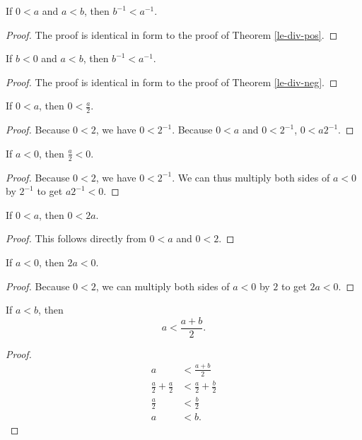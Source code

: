 \documentclass[../math.tex]{subfiles}
\begin{document}
\begin{theorem}
    If $0 < a$ and $a < b$, then $b^{-1} < a^{-1}$.
\end{theorem}
\begin{proof}
    The proof is identical in form to the proof of Theorem \ref{le-div-pos}.
\end{proof}

\begin{theorem}
    If $b < 0$ and $a < b$, then $b^{-1} < a^{-1}$.
\end{theorem}
\begin{proof}
    The proof is identical in form to the proof of Theorem \ref{le-div-neg}.
\end{proof}

\begin{theorem}
    If $0 < a$, then $0 < \frac{a}{2}$.
\end{theorem}
\begin{proof}
    Because $0 < 2$, we have $0 < 2^{-1}$.  Because $0 < a$ and $0 < 2^{-1}$, $0
    < a2^{-1}$.
\end{proof}

\begin{theorem}
    If $a < 0$, then $\frac{a}{2} < 0$.
\end{theorem}
\begin{proof}
    Because $0 < 2$, we have $0 < 2^{-1}$.  We can thus multiply both sides of
    $a < 0$ by $2^{-1}$ to get $a2^{-1} < 0$.
\end{proof}

\begin{theorem}
    If $0 < a$, then $0 < 2a$.
\end{theorem}
\begin{proof}
    This follows directly from $0 < a$ and $0 < 2$.
\end{proof}

\begin{theorem}
    If $a < 0$, then $2a < 0$.
\end{theorem}
\begin{proof}
    Because $0 < 2$, we can multiply both sides of $a < 0$ by $2$ to get $2a <
    0$.
\end{proof}

\begin{theorem}
    If $a < b$, then
    \[
        a < \frac{a + b}{2}.
    \]
\end{theorem}
\begin{proof}
    \begin{align*}
        a &< \frac{a + b}{2} \\
        \frac{a}{2} + \frac{a}{2} &< \frac{a}{2} + \frac{b}{2} \\
        \frac{a}{2} &< \frac{b}{2} \\
        a &< b.
    \end{align*}
\end{proof}
\end{document}
